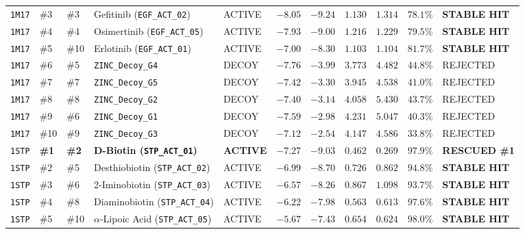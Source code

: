 \documentclass[11pt,a4paper]{article}
\begin{document}
{\begin{longtable}{L{0.8cm} C{0.65cm} C{0.65cm} L{2.6cm} C{1.3cm} R{0.95cm} R{0.95cm} R{1.0cm} R{0.9cm} R{0.95cm} C{1.85cm}}
\texttt{1M17} & \#3 & \#3 & Gefitinib (\texttt{EGF\_ACT\_02}) & ACTIVE & $-8.05$ & $-9.24$ & $1.130$ & $1.314$ & $78.1\%$ & \textcolor{passgreen}{\textbf{STABLE HIT}} \\
\texttt{1M17} & \#4 & \#4 & Osimertinib (\texttt{EGF\_ACT\_05}) & ACTIVE & $-7.93$ & $-9.00$ & $1.216$ & $1.229$ & $79.5\%$ & \textcolor{passgreen}{\textbf{STABLE HIT}} \\
\texttt{1M17} & \#5 & \#10 & Erlotinib (\texttt{EGF\_ACT\_01}) & ACTIVE & $-7.00$ & $-8.30$ & $1.103$ & $1.104$ & $81.7\%$ & \textcolor{passgreen}{\textbf{STABLE HIT}} \\
\texttt{1M17} & \#6 & \#5 & \texttt{ZINC\_Decoy\_G4} & DECOY & $-7.76$ & $-3.99$ & $3.773$ & $4.482$ & $44.8\%$ & \textcolor{failred}{REJECTED} \\
\texttt{1M17} & \#7 & \#7 & \texttt{ZINC\_Decoy\_G5} & DECOY & $-7.42$ & $-3.30$ & $3.945$ & $4.538$ & $41.0\%$ & \textcolor{failred}{REJECTED} \\
\texttt{1M17} & \#8 & \#8 & \texttt{ZINC\_Decoy\_G2} & DECOY & $-7.40$ & $-3.14$ & $4.058$ & $5.430$ & $43.7\%$ & \textcolor{failred}{REJECTED} \\
\texttt{1M17} & \#9 & \#6 & \texttt{ZINC\_Decoy\_G1} & DECOY & $-7.59$ & $-2.98$ & $4.231$ & $5.047$ & $40.3\%$ & \textcolor{failred}{REJECTED} \\
\texttt{1M17} & \#10 & \#9 & \texttt{ZINC\_Decoy\_G3} & DECOY & $-7.12$ & $-2.54$ & $4.147$ & $4.586$ & $33.8\%$ & \textcolor{failred}{REJECTED} \\
\midrule
\texttt{1STP} & \textbf{\#1} & \textbf{\#2} & \textbf{D-Biotin (\texttt{STP\_ACT\_01})} & \textbf{ACTIVE} & $\mathbf{-7.27}$ & $\mathbf{-9.03}$ & $\mathbf{0.462}$ & $\mathbf{0.269}$ & $\mathbf{97.9\%}$ & \textcolor{passgreen}{\textbf{RESCUED \#1}} \\
\texttt{1STP} & \#2 & \#5 & Desthiobiotin (\texttt{STP\_ACT\_02}) & ACTIVE & $-6.99$ & $-8.70$ & $0.726$ & $0.862$ & $94.8\%$ & \textcolor{passgreen}{\textbf{STABLE HIT}} \\
\texttt{1STP} & \#3 & \#6 & 2-Iminobiotin (\texttt{STP\_ACT\_03}) & ACTIVE & $-6.57$ & $-8.26$ & $0.867$ & $1.098$ & $93.7\%$ & \textcolor{passgreen}{\textbf{STABLE HIT}} \\
\texttt{1STP} & \#4 & \#8 & Diaminobiotin (\texttt{STP\_ACT\_04}) & ACTIVE & $-6.22$ & $-7.98$ & $0.563$ & $0.613$ & $97.6\%$ & \textcolor{passgreen}{\textbf{STABLE HIT}} \\
\texttt{1STP} & \#5 & \#10 & $\alpha$-Lipoic Acid (\texttt{STP\_ACT\_05}) & ACTIVE & $-5.67$ & $-7.43$ & $0.654$ & $0.624$ & $98.0\%$ & \textcolor{passgreen}{\textbf{STABLE HIT}} \\

\end{longtable}}
\end{document}
